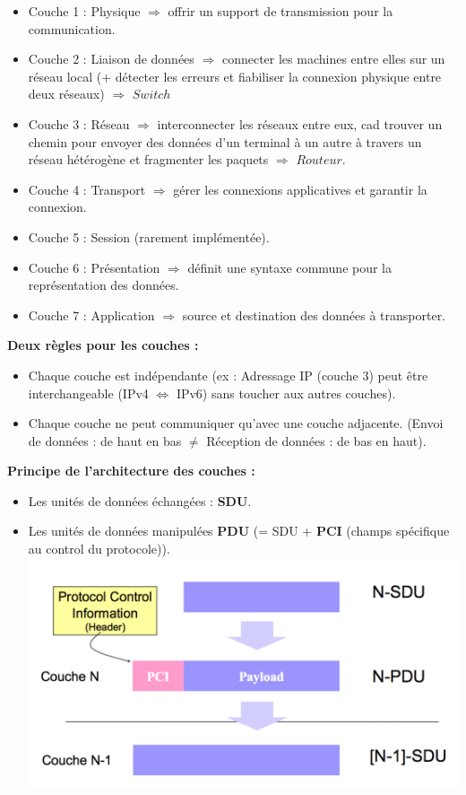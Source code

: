 \documentclass[a4paper,9pt, twocolumn]{article}
\begin{document}
\begin{itemize}
\begin{center}
		\end{center}
		\item Couche 1 : Physique $\Longrightarrow$ offrir un support de transmission pour la communication.
		\item Couche 2 : Liaison de données $\Longrightarrow$ connecter les machines entre elles sur un réseau local (+ détecter les erreurs et fiabiliser la connexion physique entre deux réseaux) $\Longrightarrow$ $Switch$
		\item Couche 3 : Réseau $\Longrightarrow$ interconnecter les réseaux entre eux, cad trouver un chemin pour envoyer des données d'un terminal à un autre à travers un réseau hétérogène et fragmenter les paquets $\Longrightarrow$ $Routeur$.
		\item Couche 4 : Transport $\Longrightarrow$ gérer les connexions applicatives et garantir la connexion.
		\item Couche 5 : Session (rarement implémentée).
		\item Couche 6 : Présentation $\Longrightarrow$ définit une syntaxe commune pour la représentation des données.
		\item Couche 7 : Application $\Longrightarrow$ source et destination des données à transporter.
	\end{itemize}

	\textbf{Deux règles pour les couches : }
	\begin{itemize}
		\item Chaque couche est indépendante (ex : Adressage IP (couche 3) peut être interchangeable (IPv4 $\Leftrightarrow$ IPv6) sans toucher aux autres couches).
		\item Chaque couche ne peut communiquer qu'avec une couche adjacente. (Envoi de données : de haut en bas $\neq$ Réception de données : de bas en haut).
	\end{itemize}

	\textbf{Principe de l'architecture des couches :}
	\begin{itemize}
		\item Les unités de données échangées : \textbf{SDU}.
		\item Les unités de données manipulées \textbf{PDU} (= SDU + \textbf{PCI} (champs spécifique au control du protocole)).
			\includegraphics[scale=0.4]{PDU.png}
	\end{itemize}
	
\end{document}
